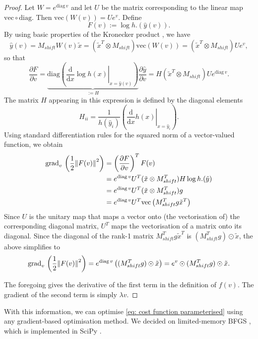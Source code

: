 \documentclass{article}
\begin{document}
\begin{proof}
Let $W = e^{\mathrm{diag}\, v}$ and let $U$ be the matrix corresponding to the linear map $\mathrm{vec} \circ \mathrm{diag}$. Then $\mathrm{vec}\left(W(v)\right) = U e^v$.
Define $$
F(v) := \log h.(\hat{y}(v))
.$$
By using basic properties of the Kronecker product \cite[eq. 1.3.6]{Golub2013}, we have
$$
\hat{y}(v) = M_{shift} W(v) \tilde{x}
=
(\tilde{x}^T \otimes M_{shift}) \mathrm{vec} \left(W(v)\right)
=
(\tilde{x}^T \otimes M_{shift}) U e^v
,$$
so that
$$
\frac{\partial F}{\partial v}
=
\underbrace{\mathrm{diag}\left(
    \left.\frac{\mathrm{d}}{\mathrm{d}x} \log h(x)\right\vert_{x = \hat{y}(v)}
    \right)}_{:= H}
\frac{\partial \hat{y}}{\partial v}
=
H (\tilde{x}^T \otimes M_{shift}) U e^{\mathrm{diag}\, v}
.$$
The matrix $H$ appearing in this expression is defined by the diagonal elements 
$$
H_{ii} = \frac{1}{h(\hat{y}_i)}\left(\left.\frac{\mathrm{d}}{\mathrm{d}x} h(x)\right\vert_{x = \hat{y}_i} \right)
.$$
Using standard differentiation rules for the squared norm of a vector-valued function, we obtain
\begin{align*}
\mathrm{grad}_v\, \left(\frac{1}{2} \norm{F(v)}^2 \right)
&=
\left(\frac{\partial F}{\partial v}\right)^T F(v) \\
&= e^{\mathrm{diag}\, v} U^T (\tilde{x} \otimes M_{shift}^T) H \log h.(\hat{y}) \\
&= e^{\mathrm{diag}\, v} U^T (\tilde{x} \otimes M_{shift}^T) g \\
&= e^{\mathrm{diag}\, v} U^T \mathrm{vec}\left(M_{shift}^T g \tilde{x}^T\right)
\end{align*}
Since $U$ is the unitary map that maps a vector onto (the vectorisation of) the corresponding diagonal matrix, $U^T$ maps the vectorisation of a matrix onto its diagonal.
Since the diagonal of the rank-1 matrix $M_{shift}^T g \tilde{x}^T$ is $(M_{shift}^T g) \odot \tilde{x}$, the above simplifies to
$$
\mathrm{grad}_v\, \left(\frac{1}{2} \norm{F(v)}^2 \right)
=
e^{\mathrm{diag}\, v} \left( (M_{shift}^T g) \odot \tilde{x} \right) = e^{v} \odot (M_{shift}^T g) \odot \tilde{x}
.$$


The foregoing gives the derivative of the first term in the definition of $f(v)$. The gradient of the second term is simply $\lambda v$.
\end{proof}

With this information, we can optimise \cref{eq: cost function parameterised} using any gradient-based optimisation method. We decided on limited-memory BFGS \cite{Nocedal2006}, which is implemented in SciPy \cite{virtanen2020scipy}.
\end{document}
